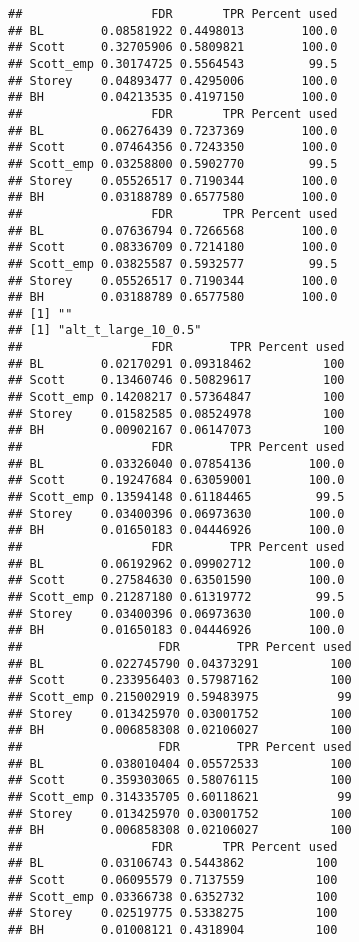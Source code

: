\documentclass{article}\usepackage[]{graphicx}\usepackage[]{color}
\makeatletter
\newenvironment{kframe}{%
 \def\at@end@of@kframe{}%
 \ifinner\ifhmode%
  \def\at@end@of@kframe{\end{minipage}}%
  \begin{minipage}{\columnwidth}%
 \fi\fi%
 \def\FrameCommand##1{\hskip\@totalleftmargin \hskip-\fboxsep
 \colorbox{shadecolor}{##1}\hskip-\fboxsep
     \hskip-\linewidth \hskip-\@totalleftmargin \hskip\columnwidth}%
 \MakeFramed {\advance\hsize-\width
   \@totalleftmargin\z@ \linewidth\hsize
   \@setminipage}}%
 {\par\unskip\endMakeFramed%
 \at@end@of@kframe}
\newenvironment{knitrout}{}{} %
\makeatother
\begin{document}
\begin{knitrout}
\begin{kframe}
\begin{verbatim}
##                  FDR       TPR Percent used
## BL        0.08581922 0.4498013        100.0
## Scott     0.32705906 0.5809821        100.0
## Scott_emp 0.30174725 0.5564543         99.5
## Storey    0.04893477 0.4295006        100.0
## BH        0.04213535 0.4197150        100.0
##                  FDR       TPR Percent used
## BL        0.06276439 0.7237369        100.0
## Scott     0.07464356 0.7243350        100.0
## Scott_emp 0.03258800 0.5902770         99.5
## Storey    0.05526517 0.7190344        100.0
## BH        0.03188789 0.6577580        100.0
##                  FDR       TPR Percent used
## BL        0.07636794 0.7266568        100.0
## Scott     0.08336709 0.7214180        100.0
## Scott_emp 0.03825587 0.5932577         99.5
## Storey    0.05526517 0.7190344        100.0
## BH        0.03188789 0.6577580        100.0
## [1] ""
## [1] "alt_t_large_10_0.5"
##                  FDR        TPR Percent used
## BL        0.02170291 0.09318462          100
## Scott     0.13460746 0.50829617          100
## Scott_emp 0.14208217 0.57364847          100
## Storey    0.01582585 0.08524978          100
## BH        0.00902167 0.06147073          100
##                  FDR        TPR Percent used
## BL        0.03326040 0.07854136        100.0
## Scott     0.19247684 0.63059001        100.0
## Scott_emp 0.13594148 0.61184465         99.5
## Storey    0.03400396 0.06973630        100.0
## BH        0.01650183 0.04446926        100.0
##                  FDR        TPR Percent used
## BL        0.06192962 0.09902712        100.0
## Scott     0.27584630 0.63501590        100.0
## Scott_emp 0.21287180 0.61319772         99.5
## Storey    0.03400396 0.06973630        100.0
## BH        0.01650183 0.04446926        100.0
##                   FDR        TPR Percent used
## BL        0.022745790 0.04373291          100
## Scott     0.233956403 0.57987162          100
## Scott_emp 0.215002919 0.59483975           99
## Storey    0.013425970 0.03001752          100
## BH        0.006858308 0.02106027          100
##                   FDR        TPR Percent used
## BL        0.038010404 0.05572533          100
## Scott     0.359303065 0.58076115          100
## Scott_emp 0.314335705 0.60118621           99
## Storey    0.013425970 0.03001752          100
## BH        0.006858308 0.02106027          100
##                  FDR       TPR Percent used
## BL        0.03106743 0.5443862          100
## Scott     0.06095579 0.7137559          100
## Scott_emp 0.03366738 0.6352732          100
## Storey    0.02519775 0.5338275          100
## BH        0.01008121 0.4318904          100

\end{verbatim}
\end{kframe}
\end{knitrout}
\end{document}
